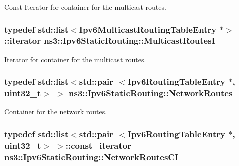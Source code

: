 Const Iterator for container for the multicast routes. 

\subsubsection[{\texorpdfstring{Multicast\+RoutesI}{MulticastRoutesI}}]{\setlength{\rightskip}{0pt plus 5cm}typedef {\bf std\+::list}$<${\bf Ipv6\+Multicast\+Routing\+Table\+Entry} $\ast$$>$\+::iterator {\bf ns3\+::\+Ipv6\+Static\+Routing\+::\+Multicast\+RoutesI}\hspace{0.3cm}{\ttfamily [private]}}\hypertarget{classns3_1_1Ipv6StaticRouting_aed9967a6ba9f015a1812644f7b2cde1f}{}\label{classns3_1_1Ipv6StaticRouting_aed9967a6ba9f015a1812644f7b2cde1f}


Iterator for container for the multicast routes. 

\subsubsection[{\texorpdfstring{Network\+Routes}{NetworkRoutes}}]{\setlength{\rightskip}{0pt plus 5cm}typedef {\bf std\+::list}$<$std\+::pair $<${\bf Ipv6\+Routing\+Table\+Entry} $\ast$, uint32\+\_\+t$>$ $>$ {\bf ns3\+::\+Ipv6\+Static\+Routing\+::\+Network\+Routes}\hspace{0.3cm}{\ttfamily [private]}}\hypertarget{classns3_1_1Ipv6StaticRouting_aa2ac656240490a12d7d3a834a75af7fd}{}\label{classns3_1_1Ipv6StaticRouting_aa2ac656240490a12d7d3a834a75af7fd}


Container for the network routes. 

\subsubsection[{\texorpdfstring{Network\+Routes\+CI}{NetworkRoutesCI}}]{\setlength{\rightskip}{0pt plus 5cm}typedef {\bf std\+::list}$<$std\+::pair $<${\bf Ipv6\+Routing\+Table\+Entry} $\ast$, uint32\+\_\+t$>$ $>$\+::const\+\_\+iterator {\bf ns3\+::\+Ipv6\+Static\+Routing\+::\+Network\+Routes\+CI}\hspace{0.3cm}{\ttfamily [private]}}\hypertarget{classns3_1_1Ipv6StaticRouting_ad3c559fcd440cfe8e3a127f132c03527}{}\label{classns3_1_1Ipv6StaticRouting_ad3c559fcd440cfe8e3a127f132c03527}


